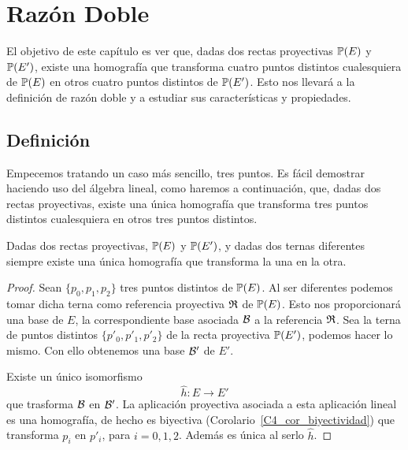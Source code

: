 \chapter{Razón Doble}
El objetivo de este capítulo es ver que, dadas dos rectas proyectivas $\mathbb{P}(E)$ y $\mathbb{P}(E')$, existe una homografía que transforma cuatro puntos distintos cualesquiera de $\mathbb{P}(E)$ en otros cuatro puntos distintos de $\mathbb{P}(E')$. Esto nos llevará a la definición de razón doble y a estudiar sus características y propiedades.

\section{Definición}
Empecemos tratando un caso más sencillo, tres puntos. Es fácil demostrar haciendo uso del álgebra lineal, como haremos a continuación, que, dadas dos rectas proyectivas, existe una única homografía que transforma tres puntos distintos cualesquiera en otros tres puntos distintos.

\begin{prop}
	\label{C5_prop_homografia3puntos}
	Dadas dos rectas proyectivas, $\mathbb{P}(E)$ y $\mathbb{P}(E')$, y dadas dos ternas diferentes siempre existe una única homografía que transforma la una en la otra.
\end{prop}
\begin{proof}
	Sean $\{p_0,p_1,p_2\}$ tres puntos distintos de $\mathbb{P}(E)$. Al ser diferentes podemos tomar dicha terna como referencia proyectiva $\mathfrak{R}$ de $\mathbb{P}(E)$. Esto nos proporcionará una base de $E$, la correspondiente base asociada $\mathcal{B}$ a la referencia $\mathfrak{R}$. Sea la terna de puntos distintos $\{p'_0,p'_1,p'_2\}$ de la recta proyectiva $\mathbb{P}(E')$, podemos hacer lo mismo. Con ello obtenemos una base $\mathcal{B'}$ de $E'$. 
	
	Existe un único isomorfismo 
	\[\widehat{h}:E\rightarrow E'\]
	que trasforma $\mathcal{B}$ en $\mathcal{B'}$. La aplicación proyectiva asociada a esta aplicación lineal es una homografía, de hecho es biyectiva (Corolario~\ref{C4_cor_biyectividad}) que transforma $p_i$ en $p'_i$, para $i=0,1,2$. Además es única al serlo $\widehat{h}$.
\end{proof}

